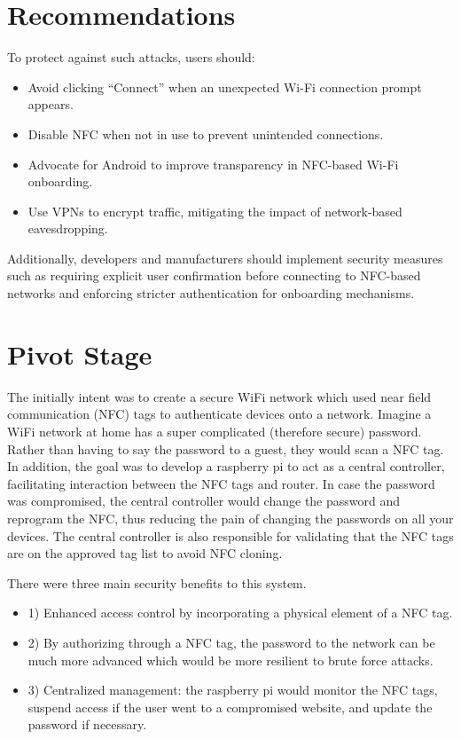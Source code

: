 \documentclass[sigconf]{acmart}
\begin{document}
\section{Recommendations}
To protect against such attacks, users should:
\begin{itemize}
    \item Avoid clicking “Connect” when an unexpected Wi-Fi connection prompt appears.
    \item Disable NFC when not in use to prevent unintended connections.
    \item Advocate for Android to improve transparency in NFC-based Wi-Fi onboarding.
    \item Use VPNs to encrypt traffic, mitigating the impact of network-based eavesdropping.
\end{itemize}

Additionally, developers and manufacturers should implement security measures such as requiring explicit user confirmation before connecting to NFC-based networks and enforcing stricter authentication for onboarding mechanisms.

\section{Pivot Stage}

The initially intent was to create a secure WiFi network which used near field communication (NFC) tags to authenticate devices onto a network. Imagine a WiFi network at home has a super complicated (therefore secure) password. Rather than having to say the password to a guest, they would scan a NFC tag. In addition, the goal was to develop a raspberry pi to act as a central controller, facilitating interaction between the NFC tags and router. In case the password was compromised, the central controller would change the password and reprogram the NFC, thus reducing the pain of changing the passwords on all your devices. The central controller is also responsible for validating that the NFC tags are on the approved tag list to avoid NFC cloning. \newline

There were three main security benefits to this system. 

\begin{itemize}
    \item 1) Enhanced access control by incorporating a physical element of a NFC tag. 
    \item 2) By authorizing through a NFC tag, the password to the network can be much more advanced which would be more resilient to brute force attacks. 
    \item 3) Centralized management: the raspberry pi would monitor the NFC tags, suspend access if the user went to a compromised website, and update the password if necessary. 
\end{itemize}
\end{document}
